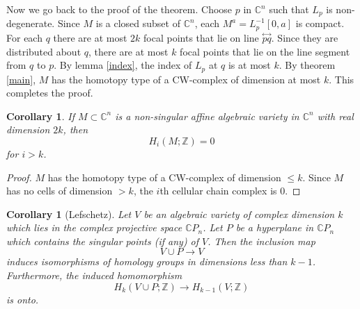\documentclass[a4paper,11pt,reqno]{amsart}
\newtheorem{cor}[thm]{Corollary}
\newcommand{\ZZ}{\mathbb{Z}}      %
\newcommand{\CC}{\mathbb{C}}
\begin{document}
Now we go back to the proof of the theorem. Choose $p$ in $\CC^n$ such that
$L_p$ is non-degenerate. Since $M$ is a closed subset of $\CC^n$, each $M^a =
L_p^{-1}[0, a]$ is compact. For each $q$ there are at most $2k$ focal points
that lie on line $\stackrel{\leftrightarrow}{pq}$. Since they are distributed
about $q$, there are at most $k$ focal points that lie on the line segment from
$q$ to $p$. By lemma \ref{index}, the index of $L_p$ at $q$ is at most $k$. By
theorem \ref{main}, $M$ has the homotopy type of a CW-complex of dimension at
most $k$. This completes the proof.

\begin{cor}
  If $M \subset \CC^n$ is a non-singular affine algebraic variety in $\CC^n$
  with real dimension $2k$, then
  \begin{equation}
    H_i(M; \ZZ) = 0
  \end{equation}
  for $i>k$.
\end{cor}

\begin{proof}
  $M$ has the homotopy type of a CW-complex of dimension $\le k$. Since $M$ has
  no cells of dimension $ > k$, the $i$th cellular chain complex is $0$.
\end{proof}

\begin{cor}[Lefschetz]
  Let $V$ be an algebraic variety of complex dimension $k$ which lies in the
  complex projective space $\CC P_n$. Let $P$ be a hyperplane in $\CC P_n$ which
  contains the singular points (if any) of $V$. Then the inclusion map
  \begin{equation}
    V\cup P \to V
  \end{equation}
  induces isomorphisms of homology groups in dimensions less than
  $k-1$. Furthermore, the induced homomorphism
  \begin{equation}
    H_k(V\cup P;\ZZ) \to H_{k-1}(V;\ZZ)
  \end{equation}
  is onto.
\end{cor}
\end{document}
